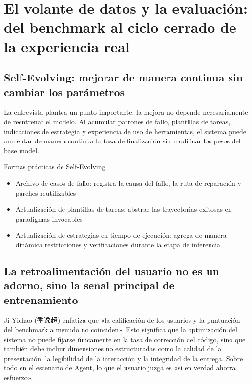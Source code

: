 \section{El volante de datos y la evaluación: del benchmark al ciclo cerrado de la experiencia real}

\subsection{Self-Evolving: mejorar de manera continua sin cambiar los parámetros}

La entrevista plantea un punto importante: la mejora no depende necesariamente de reentrenar el modelo. Al acumular patrones de fallo, plantillas de tareas, indicaciones de estrategia y experiencia de uso de herramientas, el sistema puede aumentar de manera continua la tasa de finalización sin modificar los pesos del base model.

\begin{knowledgebox}{Formas prácticas de Self-Evolving}
\begin{itemize}
    \item Archivo de casos de fallo: registra la causa del fallo, la ruta de reparación y parches reutilizables
    \item Actualización de plantillas de tareas: abstrae las trayectorias exitosas en paradigmas invocables
    \item Actualización de estrategias en tiempo de ejecución: agrega de manera dinámica restricciones y verificaciones durante la etapa de inferencia
\end{itemize}
\end{knowledgebox}

\subsection{La retroalimentación del usuario no es un adorno, sino la señal principal de entrenamiento}

Ji Yichao (季逸超) enfatiza que «la calificación de los usuarios y la puntuación del benchmark a menudo no coinciden». Esto significa que la optimización del sistema no puede fijarse únicamente en la tasa de corrección del código, sino que también debe incluir dimensiones no estructuradas como la calidad de la presentación, la legibilidad de la interacción y la integridad de la entrega. Sobre todo en el escenario de Agent, lo que el usuario juzga es «si en verdad ahorra esfuerzo».

